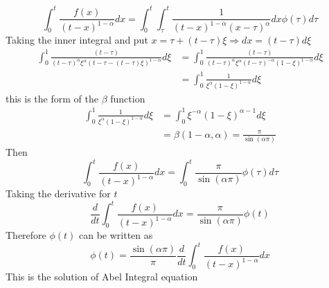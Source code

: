 \begin{center}
\end{center}
\[
\int_{0}^{t} \frac{f(x)}{{(t-x)}^{1-\alpha}} dx= \int_{0}^{t}\int_{\tau}^{t} \frac{1}{{(t-x)}^{1-\alpha}{(x-\tau)}^\alpha} dx \phi(\tau) d\tau
\]
Taking the inner integral and put $x = \tau + (t-\tau)\xi \Longrightarrow dx = (t-\tau)d\xi$
\begin{align*}
    \int_{0}^{1} \frac{(t-\tau)}{{(t-\tau)}^\alpha \xi^{\alpha} {(t-\tau-(t-\tau)\xi)}^{1-\alpha}} d\xi 
    &= \int_{0}^{1} \frac{(t-\tau)}{{(t-\tau)}^\alpha \xi^\alpha {(t-\tau)}^{-\alpha}{(1-\xi)}^{1-\alpha}} d\xi
    \\
    &= \int_{0}^{1} \frac{1}{\xi^{\alpha} {(1-\xi)}^{1-\alpha} } d\xi
\end{align*}
this is the form of the $\beta$ function
\begin{align*}
    \int_{0}^{1} \frac{1}{\xi^{\alpha} {(1-\xi)}^{1-\alpha} } d\xi &= \int_{0}^{1} \xi^{-\alpha} {(1-\xi)}^{\alpha-1} d\xi
    \\
    &=\beta (1-\alpha,\alpha) = \frac{\pi}{\sin(\alpha\pi)}
\end{align*}
Then
\[
\int_{0}^{t} \frac{f(x)}{{(t-x)}^{1-\alpha}} dx = \int_{0}^{t} \frac{\pi}{\sin(\alpha\pi)} \phi(\tau) d\tau
\]
Taking the derivative for $t$ 
\[
\frac{d}{dt} \int_{0}^{t} \frac{f(x)}{{(t-x)}^{1-\alpha}} dx = \frac{\pi}{\sin(\alpha\pi)} \phi(t)
\]
Therefore $\phi(t)$ can be written as 
\[
\phi(t) = \frac{\sin(\alpha\pi)}{\pi}  \frac{d}{dt} \int_{0}^{t} \frac{f(x)}{{(t-x)}^{1-\alpha}} dx
\]
This is the solution of Abel Integral equation

